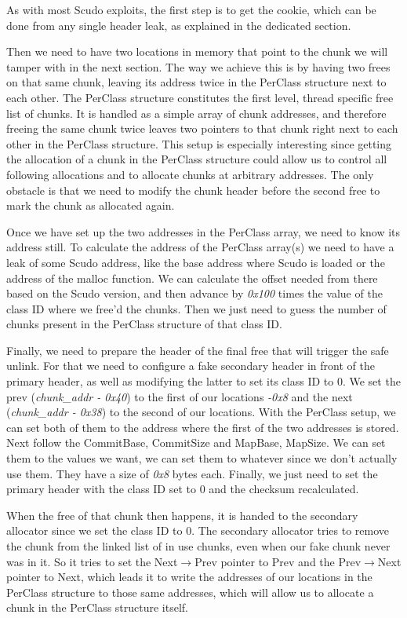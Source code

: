 \documentclass[a4paper,11pt,oneside]{report}
\begin{document}
As with most Scudo exploits, the first step is to get the cookie, which can be done from
any single header leak, as explained in the dedicated section.

Then we need to have two locations in memory that point to the chunk we will tamper with
in the next section. The way we achieve this is by having two frees on that same chunk,
leaving its address twice in the PerClass structure next to each other. The PerClass
structure constitutes the first level, thread specific free list of chunks. It is handled
as a simple array of chunk addresses, and therefore freeing the same chunk twice leaves
two pointers to that chunk right next to each other in the PerClass structure. This setup
is especially interesting since getting the allocation of a chunk in the PerClass
structure could allow us to control all following allocations and to allocate chunks at
arbitrary addresses. The only obstacle is that we need to modify the chunk header before
the second free to mark the chunk as allocated again.

Once we have set up the two addresses in the PerClass array, we need to know its address
still. To calculate the address of the PerClass array(s) we need to have a leak of some
Scudo address, like the base address where Scudo is loaded or the address of the malloc
function. We can calculate the offset needed from there based on the Scudo version, and
then advance by \emph{0x100} times the value of the class ID where we free'd the
chunks. Then we just need to guess the number of chunks present in the PerClass structure
of that class ID.

Finally, we need to prepare the header of the final free that will trigger the safe
unlink. For that we need to configure a fake secondary header in front of the primary
header, as well as modifying the latter to set its class ID to 0. We set the prev
(\emph{chunk\_addr - 0x40}) to the first of our locations \emph{-0x8} and the next
(\emph{chunk\_addr - 0x38}) to the second of our locations. With the PerClass setup, we
can set both of them to the address where the first of the two addresses is stored.  Next
follow the CommitBase, CommitSize and MapBase, MapSize. We can set them to the values we
want, we can set them to whatever since we don't actually use them. They have a size of
\emph{0x8} bytes each.  Finally, we just need to set the primary header with the class ID
set to 0 and the checksum recalculated.

When the free of that chunk then happens, it is handed to the secondary allocator since we
set the class ID to 0. The secondary allocator tries to remove the chunk from the linked
list of in use chunks, even when our fake chunk never was in it. So it tries to set the
Next$\rightarrow$Prev pointer to Prev and the Prev$\rightarrow$Next pointer to Next, which leads it to write the
addresses of our locations in the PerClass structure to those same addresses, which will
allow us to allocate a chunk in the PerClass structure itself.
\end{document}
